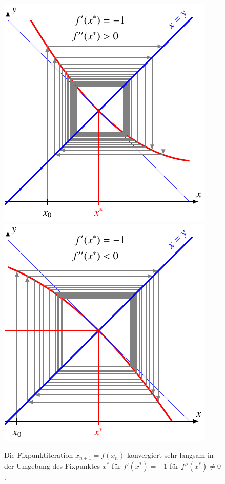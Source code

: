 \begin{figure}
\includegraphics{chapters/10-arithmetik/figures/mnqp.pdf}
\includegraphics{chapters/10-arithmetik/figures/mnqn.pdf}
\caption{Die Fixpunktiteration $x_{n+1}=f(x_n)$ konvergiert sehr langsam
in der Umgebung des Fixpunktes $x^*$ für
$f'(x^*)=-1$ für $f''(x^*)\ne 0$.
\label{buch:figure:fixpunkt:ablm1}}
\end{figure}
